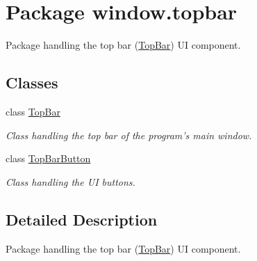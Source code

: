 \hypertarget{a00087}{\section{Package window.\-topbar}
\label{a00087}
}


Package handling the top bar (\hyperlink{a00031}{Top\-Bar}) U\-I component.  


\subsection*{Classes}
\begin{DoxyCompactItemize}
\item 
class \hyperlink{a00031}{Top\-Bar}
\begin{DoxyCompactList}\small\item\em Class handling the top bar of the program's main window. \end{DoxyCompactList}\item 
class \hyperlink{a00032}{Top\-Bar\-Button}
\begin{DoxyCompactList}\small\item\em Class handling the U\-I buttons. \end{DoxyCompactList}\end{DoxyCompactItemize}


\subsection{Detailed Description}
Package handling the top bar (\hyperlink{a00031}{Top\-Bar}) U\-I component. 